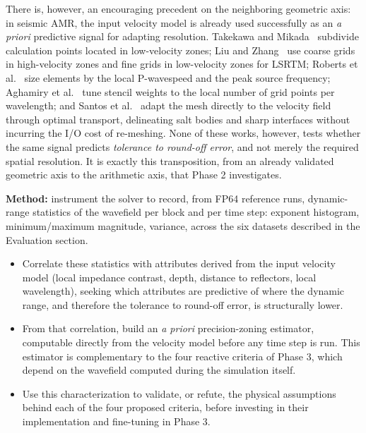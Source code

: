 \documentclass[12pt,a4paper]{article}
\begin{document}
There is, however, an encouraging precedent on the neighboring geometric
axis: in seismic AMR, the input velocity model is already used successfully
as an \emph{a priori} predictive signal for adapting resolution. Takekawa
and Mikada~\cite{takekawa2016adaptive} subdivide calculation points located
in low-velocity zones; Liu and Zhang~\cite{liu2020topography} use coarse
grids in high-velocity zones and fine grids in low-velocity zones for
LSRTM; Roberts et al.~\cite{roberts2022spyro} size elements by the local
P-wavespeed and the peak source frequency; Aghamiry et
al.~\cite{aghamiry2022wavelength} tune stencil weights to the local number
of grid points per wavelength; and Santos et
al.~\cite{santos2024optimaltransport} adapt the mesh directly to the
velocity field through optimal transport, delineating salt bodies and sharp
interfaces without incurring the I/O cost of re-meshing. None of these
works, however, tests whether the same signal predicts \emph{tolerance to
round-off error}, and not merely the required spatial resolution. It is
exactly this transposition, from an already validated geometric axis to the
arithmetic axis, that Phase 2 investigates.

\textbf{Method:} instrument the solver to record, from FP64 reference
runs, dynamic-range statistics of the wavefield per block and per time
step: exponent histogram, minimum/maximum magnitude, variance, across the
six datasets described in the Evaluation section.

\begin{itemize}
  \item Correlate these statistics with attributes derived from the input
        velocity model (local impedance contrast, depth, distance to
        reflectors, local wavelength), seeking which attributes are
        predictive of where the dynamic range, and therefore the
        tolerance to round-off error, is structurally lower.
  \item From that correlation, build an \emph{a priori} precision-zoning
        estimator, computable directly from the velocity model before any
        time step is run. This estimator is complementary to the four
        reactive criteria of Phase 3, which depend on the wavefield
        computed during the simulation itself.
  \item Use this characterization to validate, or refute, the physical
        assumptions behind each of the four proposed criteria, before
        investing in their implementation and fine-tuning in Phase 3.
\end{itemize}
\end{document}
